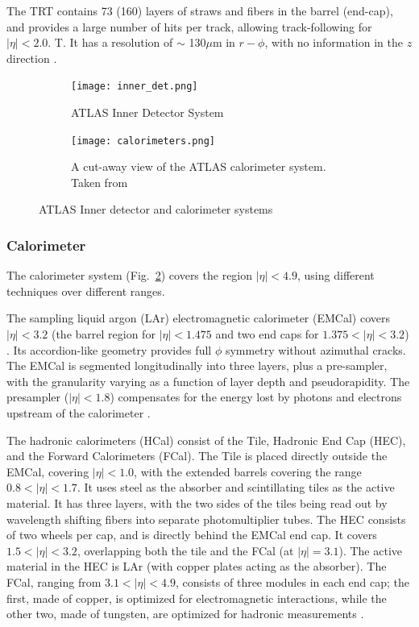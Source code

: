 The TRT contains 73 (160) layers of straws and fibers in the barrel (end-cap), and provides a large number of hits per track, allowing track-following for $|\eta| <  2.0$. T. It has a resolution of $\sim$ 130$\mu$m in $r-\phi$, with no information in the $z$ direction \cite{Aad:2008zzm}.

 \begin{figure}[htbp!]
    \centering
      \begin{subfigure}{0.44\textwidth}
        \texttt{[image: inner\_det.png]}
          \caption{ATLAS Inner Detector System}
          \label{fig:inner_det}
      \end{subfigure}
      \hfill
      \begin{subfigure}{0.49\textwidth}
        \texttt{[image: calorimeters.png]}
          \caption{A cut-away view of the ATLAS calorimeter system. Taken from \cite{Aad:2008zzm}}
          \label{fig:cal}
      \end{subfigure}
\caption{
\label{fig:atlas_systems}%
ATLAS Inner detector and calorimeter systems}
\end{figure}


\subsubsection{Calorimeter}
The calorimeter system (Fig.~\ref{fig:cal}) covers the region $|\eta| < 4.9$, using different techniques over different ranges.

The sampling liquid argon (LAr) electromagnetic calorimeter (EMCal) covers $|\eta| < 3.2$ (the barrel region for $|\eta| < 1.475$ and two end caps for $1.375 < |\eta| < 3.2$) . Its accordion-like geometry provides full $\phi$ symmetry without azimuthal cracks. The EMCal is segmented longitudinally into three layers, plus a pre-sampler, with the granularity varying as a function of layer depth and pseudorapidity. The presampler ($|\eta| <1.8$) compensates for the energy lost by photons and electrons upstream of the calorimeter \cite{Aad:2008zzm}.  

The hadronic calorimeters (HCal) consist of the Tile, Hadronic End Cap (HEC), and the Forward Calorimeters (FCal). The Tile is placed directly outside the EMCal, covering $|\eta| < 1.0$, with the extended barrels covering the range $0.8 <|\eta|< 1.7$. It uses steel as the absorber and scintillating tiles as the active material. It has three layers, with the two sides of the tiles being read out by wavelength shifting fibers into separate photomultiplier tubes. The HEC consists of two wheels per cap, and is directly behind the EMCal end cap. It covers $1.5< |\eta| < 3.2$, overlapping both the tile and the FCal (at $|\eta| =  3.1$). The active material in the HEC is LAr (with copper plates acting as the absorber). The FCal, ranging from $3.1 < |\eta| < 4.9$, consists of three modules in each end cap; the first, made of copper, is optimized for electromagnetic interactions, while the other two, made of tungsten, are optimized for hadronic measurements \cite{Aad:2008zzm}.


